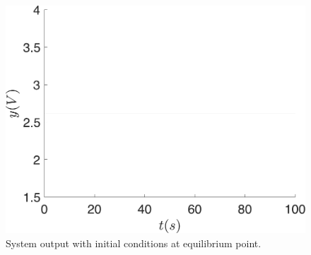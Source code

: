 \begin{figure}[H]
    \centering
    \includegraphics[scale=0.4]{figs/RosslerRquilibrium.pdf}
    \caption{System output with initial conditions at equilibrium point.}
    \label{fig:yOperPoint}
\end{figure}

